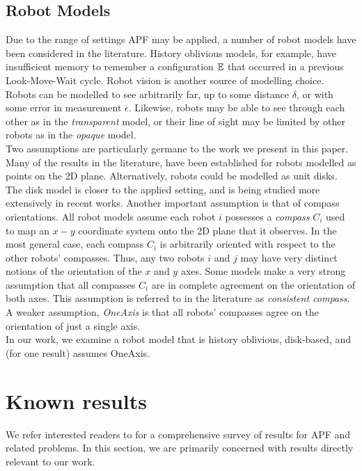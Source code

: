 \documentclass[preprint,10pt]{elsarticle}
\begin{document}
\subsection{Robot Models} 
\label{models}
Due to the range of settings APF may be applied, a number of robot models have been considered 
in the literature. History oblivious models, for example, have insufficient memory to remember
a configuration $\mathbb{E}$ that occurred in a previous Look-Move-Wait cycle. Robot vision is another 
source of modelling choice. Robots can be modelled to see arbitrarily far, up to some distance $\delta$, or
with some error in measurement $\epsilon$. Likewise, robots may be able to see through each other as in the 
\textit{transparent} model, or their line of sight may be limited by other robots as in the \textit{opaque}
model. \\

Two assumptions are particularly germane to the work we present in this paper. Many of the results in 
the literature, have been established for robots modelled as points on the 2D plane. Alternatively,
robots could be modelled as unit disks. The disk model is closer to the applied setting, and is being
studied more extensively in recent works. Another important assumption is that of compass orientations.
All robot models assume each robot $i$ possesses a \textit{compass} $C_i$ used to map an $x-y$ coordinate system
onto the 2D plane that it observes. In the most general case, each compass $C_i$ is arbitrarily oriented with
respect to the other robots' compasses. Thus, any two robots $i$ and $j$ may have very distinct notions
of the orientation of the $x$ and $y$ axes. Some models make a very strong assumption that all compasses $C_i$ 
are in complete agreement on the orientation of both axes. This assumption is referred to in the 
literature as \textit{consistent compass}. A weaker assumption, \textit{OneAxis} is 
that all robots' compasses agree on the orientation of just a single axis. \\%

In our work, we examine a robot model that is history oblivious, disk-based, and (for one result) assumes OneAxis.


\section{Known results}
	\label{prevWork}
	We refer interested readers to \cite{flocchini12distrib} for a comprehensive survey of results for
	APF and related problems. In this section, we are primarily concerned with results directly relevant
	to our work. \\
\end{document}
